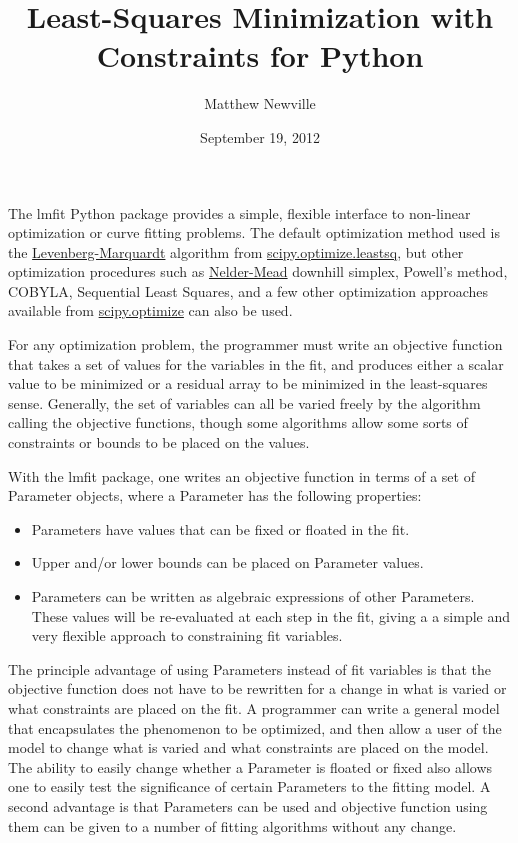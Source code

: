 \documentclass[letterpaper,10pt,english]{sphinxmanual}
\title{Least-Squares Minimization with Constraints for Python}
\date{September 19, 2012}
\author{Matthew Newville}
\begin{document}
\maketitle
\tableofcontents
{}\label{index::doc}


The lmfit Python package provides a simple, flexible interface to
non-linear optimization or curve fitting problems.  The default
optimization method used is the \href{http://en.wikipedia.org/wiki/Levenberg-Marquardt\_algorithm}{Levenberg-Marquardt} algorithm from
\href{http://docs.scipy.org/doc/scipy/reference/generated/scipy.optimize.leastsq.html}{scipy.optimize.leastsq}, but other optimization procedures such as
\href{http://en.wikipedia.org/wiki/Nelder-Mead\_method}{Nelder-Mead} downhill simplex, Powell's method, COBYLA, Sequential Least
Squares, and a few other optimization approaches available from
\href{http://docs.scipy.org/doc/scipy/reference/optimize.html}{scipy.optimize} can also be used.

For any optimization problem, the programmer must write an objective
function that takes a set of values for the variables in the fit, and
produces either a scalar value to be minimized or a residual array to be
minimized in the least-squares sense.  Generally, the set of variables can
all be varied freely by the algorithm calling the objective functions,
though some algorithms allow some sorts of constraints or bounds to be
placed on the values.

With the lmfit package, one writes an objective function in terms of a set
of Parameter objects, where a Parameter has the following properties:
\begin{itemize}
\item {} 
Parameters have values that can be fixed or floated in the fit.

\item {} 
Upper and/or lower bounds can be placed on Parameter values.

\item {} 
Parameters can be written as algebraic expressions of other Parameters.
These values will be re-evaluated at each step in the fit, giving a
a simple and very flexible approach to constraining fit variables.

\end{itemize}

The principle advantage of using Parameters instead of fit variables is
that the objective function does not have to be rewritten for a change in
what is varied or what constraints are placed on the fit.  A programmer can
write a general model that encapsulates the phenomenon to be optimized, and
then allow a user of the model to change what is varied and what
constraints are placed on the model.  The ability to easily change whether
a Parameter is floated or fixed also allows one to easily test the
significance of certain Parameters to the fitting model.  A second
advantage is that Parameters can be used and objective function using them
can be given to a number of fitting algorithms without any change.
\end{document}
